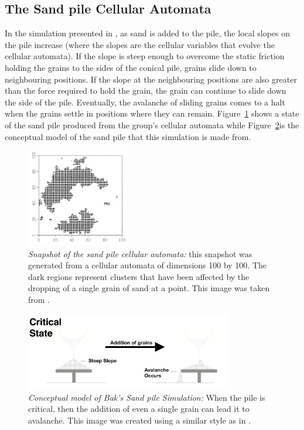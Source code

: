 \documentclass{book}
\begin{document}
\subsection{The Sand pile Cellular Automata}
In the simulation presented in \cite{OGperBak1987}, as sand is added to the pile, the local slopes on the pile increase (where the slopes are the cellular variables that evolve the cellular automata). If the slope is steep enough to overcome the static friction holding the grains to the sides of the conical pile, grains slide down to neighbouring positions. If the slope at the neighbouring positions are also greater than the force required to hold the grain,  the grain can continue to slide down the side of the pile.  Eventually, the avalanche of sliding grains comes to a halt when the grains settle in positions where they can remain. Figure~\ref{fig:perBak_cellular} shows a state of the sand pile produced from the group's cellular automata while Figure~\ref{fig:ConceptualSandpileModel}is the conceptual model of the sand pile that this simulation is made from. 
\begin{figure}[h]
	\centering
	\includegraphics[width=0.4\textwidth]{Figures/Intro/SandPileFigs/perBak_cellular}
	\caption[Snapshot of the sand pile cellular automata]{
		\textit{Snapshot of the sand pile cellular automata:} this snapshot was generated from a cellular automata of dimensions 100 by 100. The dark regions represent clusters that have been affected by the dropping of a single grain of sand at a point.  This image was taken from \cite{OGperBak1987}.}
	\label{fig:perBak_cellular}
\end{figure}
\begin{figure}[h]
	\centering
	\includegraphics[width=0.8\textwidth]{Figures/Intro/SandPileFigs/theoreticalModel}
	\caption[Conceptual model of Bak's Sand pile Simulation]{
		\textit{Conceptual model of Bak's Sand pile Simulation:} When the pile is critical, then the addition of even a single grain can lead it to avalanche. This image was created using a similar style as in \cite{IMGSandPile}.}
	\label{fig:ConceptualSandpileModel}
\end{figure}
\end{document}
